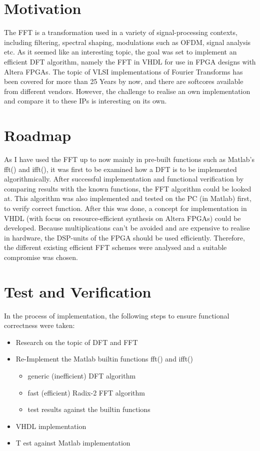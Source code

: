 \chapter{Motivation}
The FFT is a transformation used in a variety of signal-processing contexts, including filtering, spectral shaping, modulations such as OFDM, signal analysis etc. As it seemed like an interesting topic, the goal was set to implement an efficient DFT algorithm, namely the FFT in VHDL for use in FPGA designs with Altera FPGAs.
The topic of VLSI implementations of Fourier Transforms has been covered for more than 25 Years by now, and there are softcores available from different vendors. However, the challenge to realise an own implementation and compare it to these IPs is interesting on its own.

\chapter{Roadmap}
As I have used the FFT up to now mainly in pre-built functions such as Matlab's fft() and ifft(), it was first to be examined how a DFT is to be implemented algorithmically. After successful implementation and functional verification by comparing results with the known functions, the FFT algorithm could be looked at. This algorithm was also implemented and tested on the PC (in Matlab) first, to verify correct function. After this was done, a concept for implementation in VHDL (with focus on resource-efficient synthesis on Altera FPGAs) could be developed.
Because multiplications can't be avoided and are expensive to realise in hardware, the DSP-units of the FPGA should be used efficiently. Therefore, the different existing efficient FFT schemes were analysed and a suitable compromise was chosen.

\chapter{Test and Verification}
In the process of implementation, the following steps to ensure functional correctness were taken:

\begin{itemize}
	\item Research on the topic of DFT and FFT
	\item Re-Implement the Matlab builtin functions fft() and ifft()
	\begin{itemize}
		\item generic (inefficient) DFT algorithm
		\item fast (efficient) Radix-2 FFT algorithm
		\item test results against the builtin functions
	\end{itemize}
	\item VHDL implementation
	\item T	est against Matlab implementation
\end{itemize}

